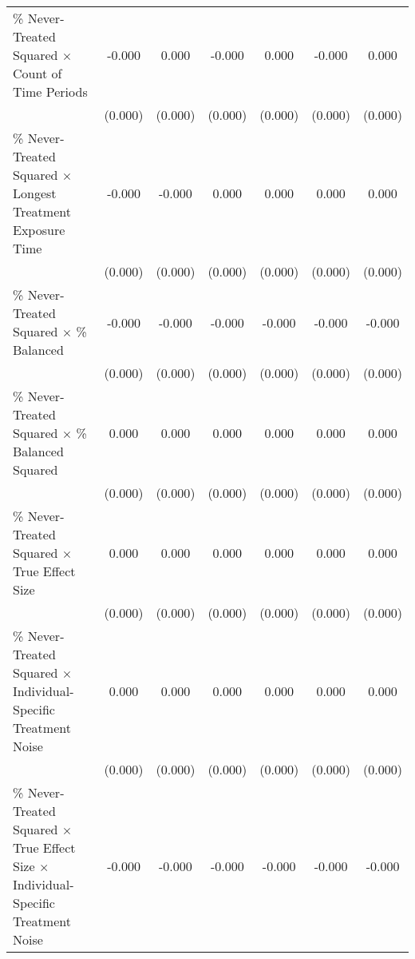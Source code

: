 \begin{table}[htbp]
\begin{tabular}{l*{6}{c}}
\% Never-Treated Squared $\times$ Count of Time Periods&      -0.000         &       0.000\sym{***}&      -0.000\sym{***}&       0.000\sym{***}&      -0.000\sym{***}&       0.000\sym{***}\\
                    &     (0.000)         &     (0.000)         &     (0.000)         &     (0.000)         &     (0.000)         &     (0.000)         \\
\% Never-Treated Squared $\times$ Longest Treatment Exposure Time&      -0.000         &      -0.000\sym{***}&       0.000\sym{***}&       0.000\sym{***}&       0.000\sym{***}&       0.000\sym{***}\\
                    &     (0.000)         &     (0.000)         &     (0.000)         &     (0.000)         &     (0.000)         &     (0.000)         \\
\% Never-Treated Squared $\times$ \% Balanced&      -0.000\sym{***}&      -0.000\sym{***}&      -0.000\sym{***}&      -0.000\sym{***}&      -0.000\sym{***}&      -0.000\sym{***}\\
                    &     (0.000)         &     (0.000)         &     (0.000)         &     (0.000)         &     (0.000)         &     (0.000)         \\
\% Never-Treated Squared $\times$ \% Balanced Squared&       0.000\sym{***}&       0.000\sym{***}&       0.000\sym{***}&       0.000\sym{***}&       0.000\sym{***}&       0.000\sym{***}\\
                    &     (0.000)         &     (0.000)         &     (0.000)         &     (0.000)         &     (0.000)         &     (0.000)         \\
\% Never-Treated Squared $\times$ True Effect Size&       0.000         &       0.000         &       0.000         &       0.000         &       0.000         &       0.000\sym{*}  \\
                    &     (0.000)         &     (0.000)         &     (0.000)         &     (0.000)         &     (0.000)         &     (0.000)         \\
\% Never-Treated Squared $\times$ Individual-Specific Treatment Noise&       0.000\sym{**} &       0.000\sym{**} &       0.000\sym{***}&       0.000         &       0.000\sym{**} &       0.000\sym{*}  \\
                    &     (0.000)         &     (0.000)         &     (0.000)         &     (0.000)         &     (0.000)         &     (0.000)         \\
\% Never-Treated Squared $\times$ True Effect Size $\times$ Individual-Specific Treatment Noise&      -0.000\sym{*}  &      -0.000\sym{**} &      -0.000         &      -0.000         &      -0.000         &      -0.000         \\

\end{tabular}
\end{table}
